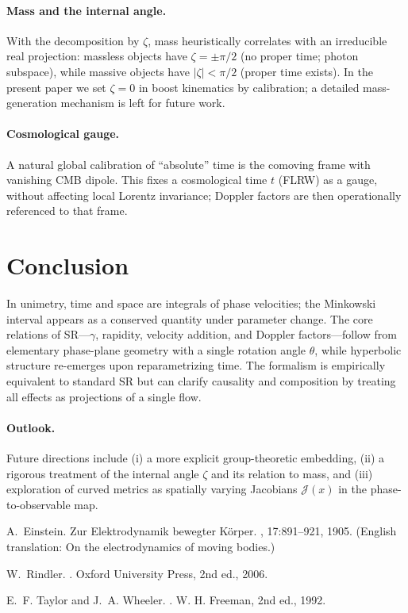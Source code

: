 \documentclass[11pt]{article}
\numberwithin{equation}{section}
\begin{document}
\paragraph{Mass and the internal angle.} With the decomposition by $\zeta$, mass heuristically correlates with an irreducible real projection: massless objects have $\zeta=\pm\pi/2$ (no proper time; photon subspace), while massive objects have $|\zeta|<\pi/2$ (proper time exists). In the present paper we set $\zeta=0$ in boost kinematics by calibration; a detailed mass-generation mechanism is left for future work.

\paragraph{Cosmological gauge.} A natural global calibration of ``absolute'' time is the comoving frame with vanishing CMB dipole. This fixes a cosmological time $t$ (FLRW) as a gauge, without affecting local Lorentz invariance; Doppler factors are then operationally referenced to that frame.

\section{Conclusion}
In unimetry, time and space are integrals of phase velocities; the Minkowski interval appears as a conserved quantity under parameter change. The core relations of SR---$\gamma$, rapidity, velocity addition, and Doppler factors---follow from elementary phase-plane geometry with a single rotation angle $\theta$, while hyperbolic structure re-emerges upon reparametrizing time. The formalism is empirically equivalent to standard SR but can clarify causality and composition by treating all effects as projections of a single flow.

\paragraph{Outlook.} Future directions include (i) a more explicit group-theoretic embedding, (ii) a rigorous treatment of the internal angle $\zeta$ and its relation to mass, and (iii) exploration of curved metrics as spatially varying Jacobians $\mathcal{J}(x)$ in the phase-to-observable map.


\begin{thebibliography}{9}

A.~Einstein.
\newblock Zur Elektrodynamik bewegter K\"{o}rper.
, 17:891--921, 1905.
(English translation: On the electrodynamics of moving bodies.)

W.~Rindler.
.
\newblock Oxford University Press, 2nd ed., 2006.

E.~F. Taylor and J.~A. Wheeler.
.
\newblock W. H. Freeman, 2nd ed., 1992.

\end{thebibliography}
\end{document}
